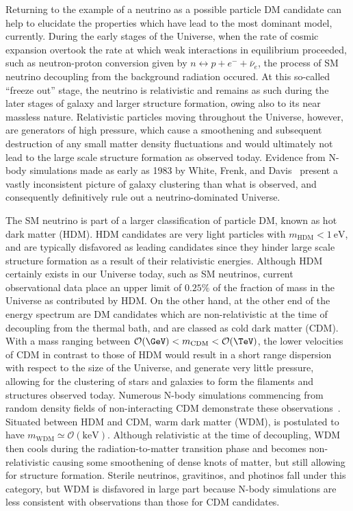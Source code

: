 Returning to the example of a neutrino as a possible particle DM candidate can help to elucidate the properties which have lead to the most dominant model, currently. During the early stages of the Universe, when the rate of cosmic expansion overtook the rate at which weak interactions in equilibrium proceeded, such as neutron-proton conversion given by $n \leftrightarrow p + e^- + \bar{\nu}_e$, the process of SM neutrino decoupling from the background radiation occured. At this so-called ``freeze out'' stage, the neutrino is relativistic and remains as such during the later stages of galaxy and larger structure formation, owing also to its near massless nature. Relativistic particles moving throughout the Universe, however, are generators of high pressure, which cause a smoothening and subsequent destruction of any small matter density fluctuations and would ultimately not lead to the large scale structure formation as observed today. Evidence from N-body simulations made as early as 1983 by White, Frenk, and Davis~\cite{White:1984yj} present a vastly inconsistent picture of galaxy clustering than what is observed, and consequently definitively rule out a neutrino-dominated Universe.

The SM neutrino is part of a larger classification of particle DM, known as hot dark matter (HDM). HDM candidates are very light particles with $m_{\mathrm{HDM}} < 1\:\mathrm{eV}$, and are typically disfavored as leading candidates since they hinder large scale structure formation as a result of their relativistic energies. Although HDM certainly exists in our Universe today, such as SM neutrinos, current observational data place an upper limit of $0.25\%$ of the fraction of mass in the Universe as contributed by HDM. On the other hand, at the other end of the energy spectrum are DM candidates which are non-relativistic at the time of decoupling from the thermal bath, and are classed as cold dark matter (CDM). With a mass ranging between $\mathcal{O}(\GeV) < m_\mathrm{CDM} < \mathcal{O}(\TeV)$, the lower velocities of CDM in contrast to those of HDM would result in a short range dispersion with respect to the size of the Universe, and generate very little pressure, allowing for the clustering of stars and galaxies to form the filaments and structures observed today. Numerous N-body simulations commencing from random density fields of non-interacting CDM demonstrate these observations~\cite{10.1093}. Situated between HDM and CDM, warm dark matter (WDM), is postulated to have $m_{\mathrm{WDM}} \simeq \mathcal{O}(\mathrm{keV})$. Although relativistic at the time of decoupling, WDM then cools during the radiation-to-matter transition phase and becomes non-relativistic causing some smoothening of dense knots of matter, but still allowing for structure formation. Sterile neutrinos, gravitinos, and photinos fall under this category, but WDM is disfavored in large part because N-body simulations are less consistent with observations than those for CDM candidates.

